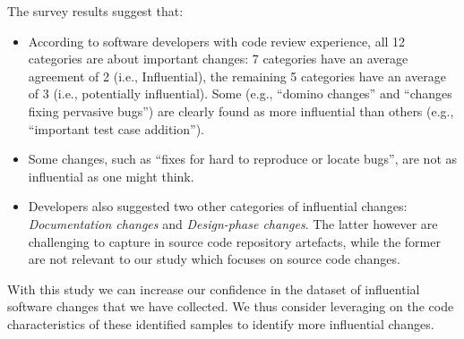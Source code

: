 The survey results suggest that:
\begin{itemize}
	\item According to software developers with code review experience, all 12 categories are about important changes: 7 categories have an average agreement of 2 (i.e., Influential), the remaining 5 categories have an average of 3 (i.e., potentially influential). Some (e.g.,  ``domino changes'' and ``changes fixing pervasive bugs'') are clearly found as more influential than others (e.g., ``important test case addition'').
	\item Some changes, such as ``fixes for hard to reproduce or locate bugs'', are not as influential as one might think.
	\item Developers also suggested two other categories of influential changes: {\em Documentation changes} and {\em Design-phase changes}. The latter however are challenging to capture in source code repository artefacts, while the former are not relevant to our study which focuses on source code changes.
\end{itemize}

With this study we can increase our confidence in the dataset of influential
software changes that we have collected. We thus consider leveraging on the
code characteristics of these identified samples to identify more influential
changes.
